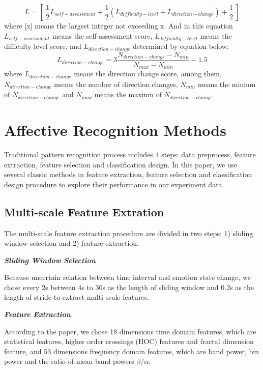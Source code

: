 \documentclass[runningheads,a4paper]{llncs}
\begin{document}
\begin{equation}
  L =  [\ \frac{1}{2}L_{self-assessment} +
      \frac{1}{2}(L_{difficulty-level} +  L_{direction-change}) + \frac{1}{2}\ ]
\end{equation}
where [x] means the largest integer not exceeding x. And in this equation \\
$L_{self-assessment}$ means the self-assessment score,
$L_{difficulty-level}$ means the difficulty level score,
and $L_{direction-change}$ determined by equation below:
\begin{equation}
   L_{direction-change} = 3\frac{N_{direction-change} -
   N_{min}}{N_{max} - N_{min}} - 1.5
\end{equation}
where $L_{direction-change}$ means the direction change score, among them,\\
$N_{direction-change}$ means the number of direction changes,
$N_{min}$ means the minium of $N_{direction-change}$ and
$N_{max}$ means the maxium of $N_{direction-change}$.

\section{Affective Recognition Methods}
Traditional pattern recognition process includes 4 steps: data preprocess,
feature extraction, feature selection and classification design. In this paper,
we use several classic methods in feature extraction, feature selection
and classification design procedure to explore their performance in
our experiment data.

\subsection{Multi-scale Feature Extration}
The multi-scale feature extraction procedure are divided in two steps:
1) sliding window selection and
2) feature extraction.

\textbf{\emph{Sliding Window Selection}}

Because uncertain relation between time interval and emotion state change,
we chose every 2s between 4s to 30s as the length of sliding window and 0.2s
as the length of stride to extract multi-scale features.

\textbf{\emph{Feature Extraction}}

According to the paper\cite{Feature}, we chose 18 dimensions time domain features,
which are statistical features,
higher order crossings (HOC) features and fractal dimension feature, and 53
dimensions frequency domain features, which are band power, bin power and
the ratio of mean band powers $\beta/\alpha$.
\end{document}
